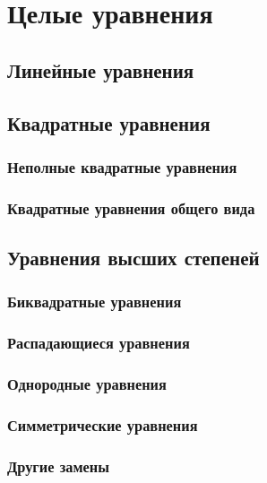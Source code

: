 \documentclass[10pt, a4paper]{article}
\begin{document}
\section{Целые уравнения}
\subsection{Линейные уравнения}
\subsection{Квадратные уравнения}
\subsubsection{Неполные квадратные уравнения}
\subsubsection{Квадратные уравнения общего вида}
\subsection{Уравнения высших степеней}
\subsubsection{Биквадратные уравнения}
\subsubsection{Распадающиеся уравнения}
\subsubsection{Однородные уравнения}
\subsubsection{Симметрические уравнения}
\subsubsection{Другие замены}
\end{document}

